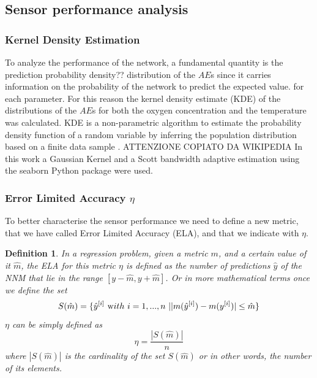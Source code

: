 \documentclass[9pt,twocolumn,twoside,pdftex]{optica}
\newtheorem{definition}{Definition}
\begin{document}
\subsection{Sensor performance analysis}

\subsubsection{Kernel Density Estimation}

To analyze the performance of the network, a fundamental quantity is the prediction probability density?? distribution of the $AE$s since it carries information on the probability of the network to predict the expected value.  for each parameter. For this reason the   kernel density estimate (KDE) of the distributions of the $AE$s for both the oxygen concentration and the temperature was calculated. KDE is a non-parametric algorithm to estimate the probability density function of a random variable by inferring the population distribution based on a finite data sample \cite{Hastie2009}. ATTENZIONE COPIATO DA WIKIPEDIA
In this work a Gaussian Kernel and a Scott bandwidth adaptive estimation \cite{Sain1996} using the seaborn Python package \cite{Waskom2020} were used.

\subsubsection{Error Limited Accuracy $\eta$}

To better characterise the sensor performance we need to define a new metric, that we have called Error Limited Accuracy (ELA), and that we indicate with $\eta$. 

\begin{definition}
In a regression problem, given a metric $m$, and a certain value of it $\hat m$, the ELA for this metric $\eta$ is defined as the number of predictions $\hat y$ of the NNM that lie in the range $[y-\hat m, y+\hat m]$. Or in more mathematical terms once we define the set
\begin{equation}
S(\hat m) = \{ \hat y^{[i]} \ {\text with } \ i = 1,..., n\ | |m(\hat y^{[i]})-m(y^{[i]})|\leq \hat m \} 
\end{equation}
$\eta$ can be simply defined as
\begin{equation}
\eta = \frac{|S(\hat m)|}{n}
\end{equation}
where $|S(\hat m)|$ is the cardinality of the set $S(\hat m)$ or in other words, the number of its elements.
\end{definition}
\end{document}
